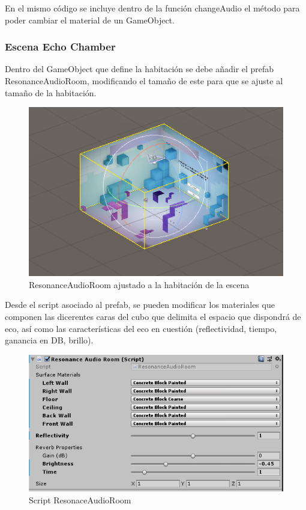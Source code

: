 \quad En el mismo código se incluye dentro de la función changeAudio el método para poder cambiar el material de un GameObject.\\

	\subsubsection{Escena Echo Chamber}
\quad Dentro del GameObject que define la habitación se debe añadir el prefab ResonanceAudioRoom, modificando el tamaño de este para que se ajuste al tamaño de la habitación.

\begin{figure}[htb]
	\centering
	\includegraphics[width=1\textwidth]{./imagenes/echoroom}
	\caption{ResonanceAudioRoom ajustado a la habitación de la escena}
\end{figure} 

\quad Desde el script asociado al prefab, se pueden modificar los materiales que componen las dicerentes caras del cubo que delimita el espacio que dispondrá de eco, así como las características del eco en cuestión (reflectividad, tiempo, ganancia en DB, brillo).\\

\begin{figure}[htb]
	\centering
	\includegraphics[width=1\textwidth]{./imagenes/audioroom}
	\caption{Script ResonaceAudioRoom}
\end{figure}

